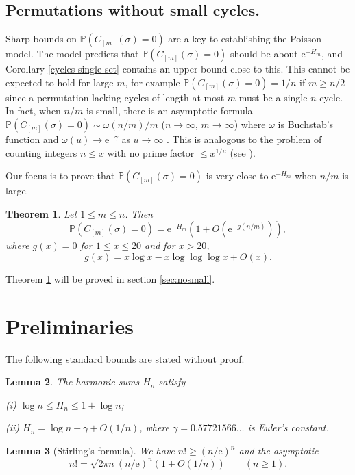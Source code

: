 \documentclass[10pt]{article}
\newtheorem{thm}{Theorem}[section]
\newtheorem{lem}[thm]{Lemma}
\newcommand{\er}{\mathrm{e}}
\newcommand{\PR}{\mathbb P}
\renewcommand{\le}{\leqslant}
\renewcommand{\ge}{\geqslant}
\renewcommand{\(}{\left(}
\renewcommand{\)}{\right)}
\begin{document}
\subsection{Permutations without small cycles.}
%
%

Sharp bounds on $\PR(C_{[m]}(\sigma)=0)$ are a
key to establishing the Poisson model.
The model predicts that $\PR(C_{[m]}(\sigma)=0)$
should be about $\er^{-H_m}$,
and Corollary \ref{cycles-single-set} contains an upper bound
close to this.
 This cannot be expected to hold for large $m$, for example 
 $\PR(C_{[m]}(\sigma)=0)=1/n$ if $m \ge n/2$ since a permutation lacking cycles of length at most $m$ must be a single $n$-cycle.
  In fact, when $n/m$ is small, there is an asymptotic formula
 $\PR(C_{[m]}(\sigma)=0) \sim \omega(n/m)/m$ ($n\to\infty$, $m\to\infty$) where $\omega$ is Buchstab's function
 and $\omega(u)\to \er^{-\gamma}$ as $u\to\infty$ \cite[Theorem 5]{granville}.  This is analogous to the problem
 of counting integers $n\le x$ with no prime factor $\le x^{1/u}$
 (see \cite[Ch. III.6]{Tenbook}).

Our focus  is to prove that
$\PR(C_{[m]}(\sigma)=0)$ is very close to $\er^{-H_m}$ when 
$n/m$ is large.

 \begin{thm}\label{nosmallcycles2}
 Let $1\le m\le n$.  Then
 \[
 \PR(C_{[m]}(\sigma)=0) = \er^{-H_{m}} \(1 + O(\er^{-g(n/m)}) \),
 \]
 where $g(x)=0$ for $1\le x\le 20$ and for $x > 20$,
 \[
g(x) = x\log x - x\log\log\log x + O(x).
 \]
 \end{thm}
 
 Theorem \ref{nosmallcycles2} will be proved in section \ref{sec:nosmall}.
\section{Preliminaries}

The following standard bounds are stated without proof.

\begin{lem}\label{harmonic}
The harmonic sums $H_n$ satisfy

(i) $\log n \le H_n \le 1 +\log n$;

(ii) $H_n = \log n + \gamma + O(1/n)$,
where
$\gamma=0.57721566\ldots$ is Euler's constant.
\end{lem}

\begin{lem}[Stirling's formula]\label{Stirling}
We have $n! \ge (n/\er)^n$ and the asymptotic
\[
n! = \sqrt{2\pi n} (n/\er)^n (1+O(1/n)) \qquad (n\ge 1).
\]
\end{lem} 
\end{document}
